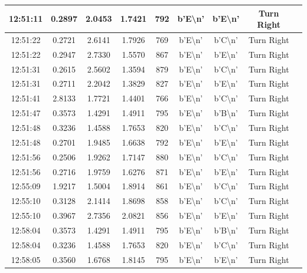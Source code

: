 \begin{table}[H]
\begin{tabular}{|c|c|c|c|c|c|c|c|c|}
    12:51:11 & 0.2897 & 2.0453 & 1.7421 & 792 & b'E\textbackslash n' & b'E\textbackslash n' & Turn Right \\ \hline
    12:51:22 & 0.2721 & 2.6141 & 1.7926 & 769 & b'E\textbackslash n' & b'C\textbackslash n' & Turn Right \\ \hline
    12:51:22 & 0.2947 & 2.7330 & 1.5570 & 867 & b'E\textbackslash n' & b'E\textbackslash n' & Turn Right \\ \hline
    12:51:31 & 0.2615 & 2.5602 & 1.3594 & 879 & b'E\textbackslash n' & b'C\textbackslash n' & Turn Right \\ \hline
    12:51:31 & 0.2711 & 2.2042 & 1.3829 & 827 & b'E\textbackslash n' & b'E\textbackslash n' & Turn Right \\ \hline
    12:51:41 & 2.8133 & 1.7721 & 1.4401 & 766 & b'E\textbackslash n' & b'C\textbackslash n' & Turn Right \\ \hline
    12:51:47 & 0.3573 & 1.4291 & 1.4911 & 795 & b'E\textbackslash n' & b'B\textbackslash n' & Turn Right \\ \hline
    12:51:48 & 0.3236 & 1.4588 & 1.7653 & 820 & b'E\textbackslash n' & b'C\textbackslash n' & Turn Right \\ \hline
    12:51:48 & 0.2701 & 1.9485 & 1.6638 & 792 & b'E\textbackslash n' & b'E\textbackslash n' & Turn Right \\ \hline
    12:51:56 & 0.2506 & 1.9262 & 1.7147 & 880 & b'E\textbackslash n' & b'C\textbackslash n' & Turn Right \\ \hline
    12:51:56 & 0.2716 & 1.9759 & 1.6276 & 871 & b'E\textbackslash n' & b'E\textbackslash n' & Turn Right \\ \hline
    12:55:09 & 1.9217 & 1.5004 & 1.8914 & 861 & b'E\textbackslash n' & b'C\textbackslash n' & Turn Right \\ \hline
    12:55:10 & 0.3128 & 2.1414 & 1.8698 & 858 & b'E\textbackslash n' & b'C\textbackslash n' & Turn Right \\ \hline
    12:55:10 & 0.3967 & 2.7356 & 2.0821 & 856 & b'E\textbackslash n' & b'E\textbackslash n' & Turn Right \\ \hline
    12:58:04 & 0.3573 & 1.4291 & 1.4911 & 795 & b'E\textbackslash n' & b'B\textbackslash n' & Turn Right \\ \hline
    12:58:04 & 0.3236 & 1.4588 & 1.7653 & 820 & b'E\textbackslash n' & b'C\textbackslash n' & Turn Right \\ \hline
    12:58:05 & 0.3560 & 1.6768 & 1.8145 & 795 & b'E\textbackslash n' & b'E\textbackslash n' & Turn Right \\ \hline

\end{tabular}
\end{table}
